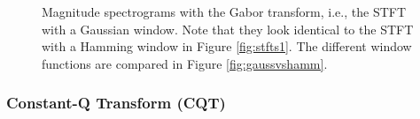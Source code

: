 \documentclass[report.tex]{subfiles}
\begin{document}
\begin{figure}[ht]
	\centering
	\\
	\\
	\caption{Magnitude spectrograms with the Gabor transform, i.e., the STFT with a Gaussian window. Note that they look identical to the STFT with a Hamming window in Figure \ref{fig:stfts1}. The different window functions are compared in Figure \ref{fig:gaussvshamm}.}
	\label{fig:stfts2}
\end{figure}

\newpagefill

\subsubsection{Constant-Q Transform (CQT)}
\label{sec:cqt}
\end{document}

